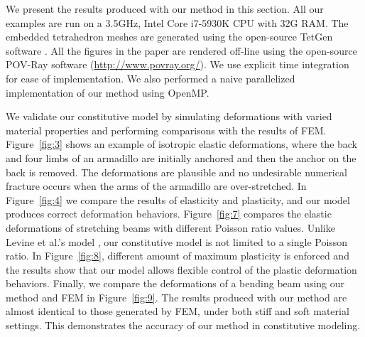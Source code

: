 We present the results produced with our method in this section. All our examples are run on a 3.5GHz, Intel Core i7-5930K CPU with 32G RAM. The embedded tetrahedron meshes are generated using the open-source TetGen software \cite{Si:2015:TDQ:2732672.2629697}. All the figures in the paper are rendered off-line using the open-source POV-Ray software (\url{http://www.povray.org/}). We use explicit time integration for ease of implementation. We also performed a naive parallelized implementation of our method using OpenMP.

 We validate our constitutive model by simulating deformations with varied material properties and performing comparisons with the results of FEM. Figure~\ref{fig:3} shows an example of isotropic elastic deformations, where the back and four limbs of an armadillo are initially anchored and then the anchor on the back is removed. The deformations are plausible and no undesirable numerical fracture occurs when the arms of the armadillo are over-stretched. In Figure~\ref{fig:4} we compare the results of elasticity and plasticity, and our model produces correct deformation behaviors. Figure~\ref{fig:7} compares the elastic deformations of stretching beams with different Poisson ratio values. Unlike Levine et al.'s model \cite{Levine:2015:PPS:2849517.2849526}, our constitutive model is not limited to a single Poisson ratio. In Figure~\ref{fig:8}, different amount of maximum plasticity is enforced and the results show that our model allows flexible control of the plastic deformation behaviors. Finally, we compare the deformations of a bending beam using our method and FEM in Figure~\ref{fig:9}. The results produced with our method are almost identical to those generated by FEM, under both stiff and soft material settings. This demonstrates the accuracy of our method in constitutive modeling.

